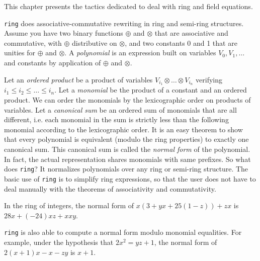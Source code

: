 \label{ring}

This chapter presents the tactics dedicated to deal with ring and
field equations.


\texttt{ring} does associative-commutative rewriting in ring and semi-ring
structures. Assume you have two binary functions $\oplus$ and $\otimes$
that are associative and commutative, with $\oplus$ distributive on
$\otimes$, and two constants 0 and 1 that are unities for $\oplus$ and
$\otimes$. A \textit{polynomial} is an expression built on variables $V_0, V_1,
\dots$ and constants by application of $\oplus$ and $\otimes$.

Let an {\it ordered product} be a product of variables $V_{i_1}
\otimes \ldots \otimes V_{i_n}$ verifying $i_1 \le i_2 \le \dots \le
i_n$. Let a \textit{monomial} be the product of a constant and an
ordered product.  We can order the monomials by the lexicographic
order on products of variables. Let a \textit{canonical sum} be an
ordered sum of monomials that are all different, i.e. each monomial in
the sum is strictly less than the following monomial according to the
lexicographic order. It is an easy theorem to show that every
polynomial is equivalent (modulo the ring properties) to exactly one
canonical sum. This canonical sum is called the \textit{normal form}
of the polynomial. In fact, the actual representation shares monomials
with same prefixes. So what does \texttt{ring}? It normalizes
polynomials over any ring or semi-ring structure. The basic use of
\texttt{ring} is to simplify ring expressions, so that the user does
not have to deal manually with the theorems of associativity and
commutativity.

\begin{Examples}
\item In the ring of integers, the normal form of
$x (3 + yx + 25(1 - z)) + zx$ is $28x + (-24)xz + xxy$.
\end{Examples}

\texttt{ring} is also able to compute a normal form modulo monomial
equalities. For example, under the hypothesis that $2x^2 = yz+1$,
 the normal form of $2(x + 1)x - x - zy$ is $x+1$.


